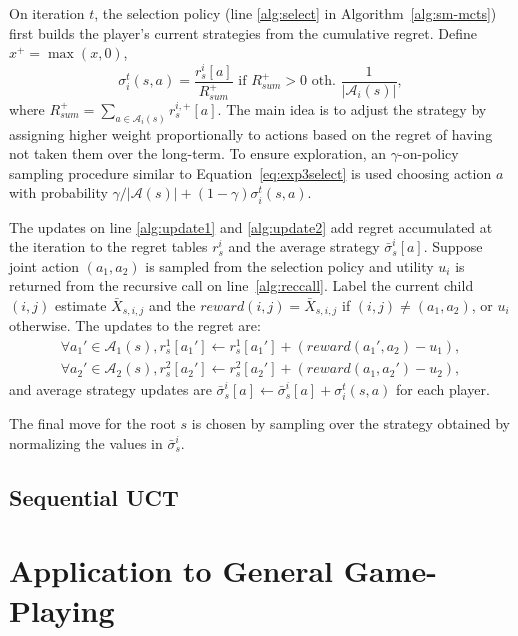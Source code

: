 \documentclass[conference]{IEEEtran}
\newcommand{\cA}{\mathcal{A}}
\begin{document}
On iteration $t$, the selection policy (line \ref{alg:select} in Algorithm~\ref{alg:sm-mcts}) first builds 
the player's current strategies from the cumulative regret. Define $x^+ = \max(x,0)$,
\begin{equation}
\label{eq:rm}
\sigma^t_i(s,a) = \frac{r^i_s[a]}{R^+_{sum}} \mbox{ if } R^+_{sum} > 0 
\mbox{ oth. } \frac{1}{|\cA_i(s)|},  
\end{equation}
where $R^+_{sum} = \sum_{a \in \cA_i(s)}{r^{i,+}_s[a]}$. 
The main idea is to adjust the strategy by assigning higher weight proportionally to actions based on the regret of 
having not taken them over the long-term. 
To ensure exploration, an $\gamma$-on-policy sampling procedure similar to Equation~\ref{eq:exp3select} is used 
choosing action $a$ with probability $\gamma/|\cA(s)| + (1-\gamma) \sigma^t_i(s,a)$. 

The updates on line \ref{alg:update1} and \ref{alg:update2} add regret accumulated at the iteration to  
the regret tables $r^i_s$ and the average strategy $\bar{\sigma}^i_s[a]$. 
Suppose joint action $(a_1,a_2)$ is 
sampled from the selection policy and utility $u_i$ is returned from the recursive call on line~\ref{alg:reccall}. 
Label the current child $(i,j)$ estimate $\bar{X}_{s,i,j}$ and the $reward(i,j) = \bar{X}_{s,i,j}$ if 
$(i,j) \not= (a_1,a_2)$, or $u_i$ otherwise. The updates to the regret are:
\begin{eqnarray*}
\forall a_1' \in \cA_1(s),  r^1_s[a_1'] \leftarrow r^1_s[a_1'] + ( reward(a_1', a_2) - u_1 ),\\
\forall a_2' \in \cA_2(s),  r^2_s[a_2'] \leftarrow r^2_s[a_2'] + ( reward(a_1, a_2') - u_2 ),
\end{eqnarray*}
\noindent and average strategy updates are $\bar{\sigma}^i_s[a] \leftarrow \bar{\sigma}^i_s[a] + \sigma^t_i(s,a)$ 
for each player.

The final move for the root $s$ is chosen by sampling over the strategy obtained by 
normalizing the values in $\bar{\sigma}_s^i$. 

\subsection{Sequential UCT}



\section{Application to General Game-Playing}
\label{sec:appggp}
\end{document}
